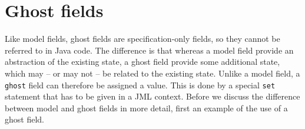 \documentclass{llncs}
\begin{document}


\section{Ghost fields}
\label{Sec:ghost}


Like model fields, ghost fields are specification-only fields,
so they cannot be referred to in Java code.
The difference is that whereas a model field provide an abstraction
of the existing state, a ghost field provide some additional state,
which may -- or may not -- be related to the existing state.
Unlike a model field, a \texttt{ghost} field can therefore
be assigned a value. This is done by a special \texttt{set} statement
that has to be given in a JML context.
Before we discuss the difference between model and ghost fields
in more detail, first an example of the use of a ghost field.
\end{document}
